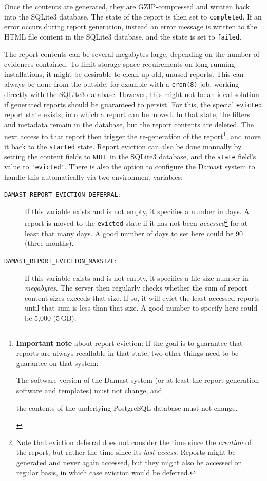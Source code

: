 Once the contents are generated, they are GZIP-compressed and written back into the SQLite3 database.
The state of the report is then set to \verb!completed!.
If an error occurs during report generation, instead an error message is written to the HTML file content in the SQLite3 database, and the state is set to \verb!failed!.

The report contents can be several megabytes large, depending on the number of evidences contained.
To limit storage space requirements on long-running installations, it might be desirable to clean up old, unused reports.
This can always be done from the outside, for example with a \verb!cron(8)! job, working directly with the SQLite3 database.
However, this might not be an ideal solution if generated reports should be guaranteed to persist.
For this, the special \verb!evicted! report state exists, into which a report can be moved.
In that state, the filters and metadata remain in the database, but the report contents are deleted.
The next access to that report then trigger the re-generation of the report\footnote{%
  \textbf{Important note} about report eviction:
  If the goal is to guarantee that reports are always recallable in that state, two other things need to be guarantee on that system:
  \begin{enumerate*}[label=(\arabic*)]
    \item The software version of the Damast system (or at least the report generation software and templates) must not change, and
    \item the contents of the underlying PostgreSQL database must not change.
  \end{enumerate*}
}, and move it back to the \verb!started! state.
Report eviction can also be done manually by setting the content fields to \verb!NULL! in the SQLite3 database, and the \verb!state! field's value to \verb!'evicted'!.
There is also the option to configure the Damast system to handle this automatically via two environment variables:

\begin{description}
  \item[\texttt{DAMAST\_REPORT\_EVICTION\_DEFERRAL}:]
    If this variable exists and is not empty, it specifies a number in days.
    A report is moved to the \texttt{evicted} state if it has not been \emph{accessed}\footnote{%
      Note that eviction deferral does not consider the time since the \emph{creation} of the report, but rather the time since its \emph{last access.}
      Reports might be generated and never again accessed, but they might also be accessed on regular basis, in which case eviction would be deferred.
    } for at least that many days.
    A good number of days to set here could be 90 (three months).
  \item[\texttt{DAMAST\_REPORT\_EVICTION\_MAXSIZE}:]
    If this variable exists and is not empty, it specifies a file size number in \emph{megabytes}.
    The server then regularly checks whether the sum of report content sizes exceeds that size.
    If so, it will evict the least-accessed reports until that sum is less than that size.
    A good number to specify here could be 5,000 (5\,GB).
\end{description}


